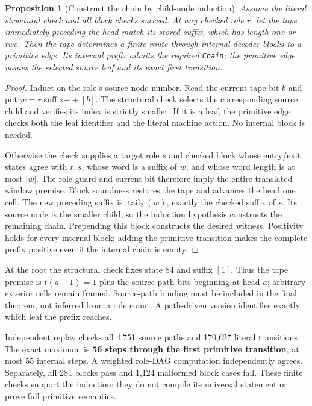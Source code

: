\documentclass[11pt]{article}
\newtheorem{proposition}{Proposition}[section]
\newcommand{\code}[1]{\texttt{#1}}
\begin{document}
\begin{proposition}[Construct the chain by child-node induction]
Assume the literal structural check and all block checks succeed. At any checked role $r$, let the tape immediately preceding the head match its stored suffix, which has length one or two. Then the tape determines a finite route through internal decoder blocks to a primitive edge. Its internal prefix admits the required \code{Chain}; the primitive edge names the selected source leaf and its exact first transition.
\end{proposition}
\begin{proof}
Induct on the role's source-node number. Read the current tape bit $b$ and put $w=r.\mathrm{suffix}\mathbin{+\!+}[b]$. The structural check selects the corresponding source child and verifies its index is strictly smaller. If it is a leaf, the primitive edge checks both the leaf identifier and the literal machine action. No internal block is needed.

Otherwise the check supplies a target role $s$ and checked block whose entry/exit states agree with $r,s$, whose word is a suffix of $w$, and whose word length is at most $|w|$. The role guard and current bit therefore imply the entire translated-window premise. Block soundness restores the tape and advances the head one cell. The new preceding suffix is $\operatorname{tail}_2(w)$, exactly the checked suffix of $s$. Its source node is the smaller child, so the induction hypothesis constructs the remaining chain. Prepending this block constructs the desired witness. Positivity holds for every internal block; adding the primitive transition makes the complete prefix positive even if the internal chain is empty.
\end{proof}

At the root the structural check fixes state 84 and suffix $[1]$. Thus the tape premise is $t(a-1)=1$ plus the source-path bits beginning at head $a$; arbitrary exterior cells remain framed. Source-path binding must be included in the final theorem, not inferred from a role count. A path-driven version identifies exactly which leaf the prefix reaches.

Independent replay checks all 4,751 source paths and 170,627 literal transitions. The exact maximum is \textbf{56 steps through the first primitive transition}, at most 55 internal steps. A weighted role-DAG computation independently agrees. Separately, all 281 blocks pass and 1,124 malformed block cases fail. These finite checks support the induction; they do not compile its universal statement or prove full primitive semantics.
\end{document}
